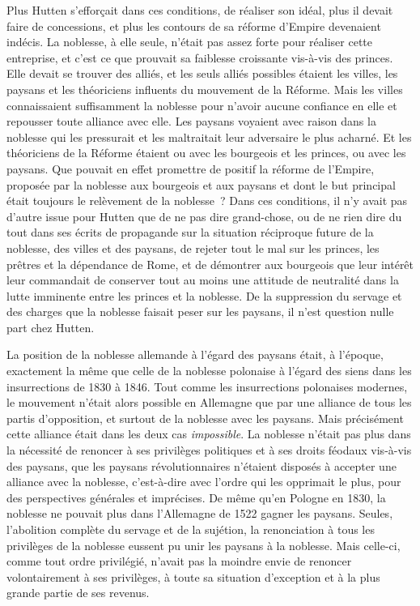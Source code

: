 \documentclass[french,twoside]{book} %
\begin{document}
Plus Hutten s’efforçait dans ces conditions, de réaliser son idéal, plus il devait faire de concessions, et plus les contours de sa réforme d’Empire devenaient indécis. La noblesse, à elle seule, n’était pas assez forte pour réaliser cette entreprise, et c’est ce que prouvait sa faiblesse croissante vis-à-vis des princes. Elle devait se trouver des alliés, et les seuls alliés possibles étaient les villes, les paysans et les théoriciens influents du mouvement de la Réforme. Mais les villes connaissaient suffisamment la noblesse pour n’avoir aucune confiance en elle et repousser toute alliance avec elle. Les paysans voyaient avec raison dans la noblesse qui les pressurait et les maltraitait leur adversaire le plus acharné. Et les théoriciens de la Réforme étaient ou avec les bourgeois et les princes, ou avec les paysans. Que pouvait en effet promettre de positif la réforme de l’Empire, proposée par la noblesse aux bourgeois et aux paysans et dont le but principal était toujours le relèvement de la noblesse ? Dans ces conditions, il n’y avait pas d’autre issue pour Hutten que de ne pas dire grand-chose, ou de ne rien dire du tout dans ses écrits de propagande sur la situation réciproque future de la noblesse, des villes et des paysans, de rejeter tout le mal sur les princes, les prêtres et la dépendance de Rome, et de démontrer aux bourgeois que leur intérêt leur commandait de conserver tout au moins une attitude de neutralité dans la lutte imminente entre les princes et la noblesse. De la suppression du servage et des charges que la noblesse faisait peser sur les paysans, il n’est question nulle part chez Hutten.\par
La position de la noblesse allemande à l’égard des paysans était, à l’époque, exactement la même que celle de la noblesse polonaise à l’égard des siens dans les insurrections de 1830 à 1846. Tout comme les insurrections polonaises modernes, le mouvement n’était alors possible en Allemagne que par une alliance de tous les partis d’opposition, et surtout de la noblesse avec les paysans. Mais précisément cette alliance était dans les deux cas \emph{impossible}. La noblesse n’était pas plus dans la nécessité de renoncer à ses privilèges politiques et à ses droits féodaux vis-à-vis des paysans, que les paysans révolutionnaires n’étaient disposés à accepter une alliance avec la noblesse, c’est-à-dire avec l’ordre qui les opprimait le plus, pour des perspectives générales et imprécises. De même qu’en Pologne en 1830, la noblesse ne pouvait plus dans l’Allemagne de 1522 gagner les paysans. Seules, l’abolition complète du servage et de la sujétion, la renonciation à tous les privilèges de la noblesse eussent pu unir les paysans à la noblesse. Mais celle-ci, comme tout ordre privilégié, n’avait pas la moindre envie de renoncer volontairement à ses privilèges, à toute sa situation d’exception et à la plus grande partie de ses revenus.\par
\end{document}
